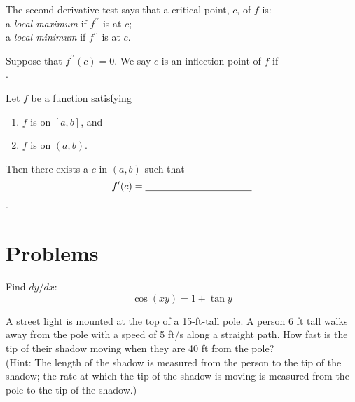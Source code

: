\documentclass[12pt]{amsart}
\begin{document}
\begin{thm}[2 Points]
  The second derivative test says that a critical point, $c$, of $f$ is:\vspace{.15in}\\
  a \textit{local maximum} if $f^{\prime\prime}$ is {\underline{\hspace{1.5in}}} at $c$;\vspace{.15in}\\
  a \textit{local minimum} if $f^{\prime\prime}$ is {\underline{\hspace{1.5in}}} at $c$.
  \vspace{.15in}
\end{thm}
\begin{thm}[1 Point]
  Suppose that $f^{\prime\prime}(c)=0$.  We say $c$ is an inflection point of $f$ if\vspace{.15in}\\
  {\underline{\hspace{4in}}}.
\end{thm}

\begin{thm}
  Let $f$ be a function satisfying
  \vspace{.15in}
  \begin{enumerate}[1.]
  \item
    $f$ is {\underline{\hspace{1.5in}}} on $[a,b]$, and
    \vspace{.15in}
  \item
    $f$ is {\underline{\hspace{1.5in}}} on $(a,b)$.
  \end{enumerate}
  \vspace{.15in}
  Then there exists a $c$ in $(a,b)$ such that
  \[f^\prime(c)={\underline{\hspace{1.5in}}}\].
\end{thm}

\newpage

\section*{Problems}

\begin{thm}[15 Points]
  Find $dy/dx$: $$\cos(xy)=1+\tan y$$
\end{thm}

\vspace{3in}

\begin{thm}[20 Points]
  A street light is mounted at the top of a 15-ft-tall pole.  A person 6 ft tall walks away from the pole with a speed of 5 ft/s along a straight path.  How fast is the tip of their shadow moving when they are 40 ft from the pole?\\ (Hint: The length of the shadow is measured from the person to the tip of the shadow; the rate at which the tip of the shadow is moving is measured from the pole to the tip of the shadow.)
\end{thm}
\end{document}
